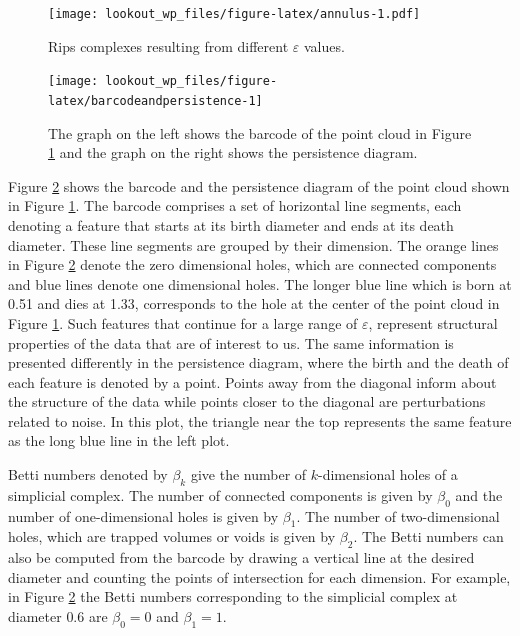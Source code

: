 \documentclass[11pt,a4paper,]{article}
\theoremstyle{definition}
\theoremstyle{definition}
\theoremstyle{definition}
\theoremstyle{remark}
\begin{document}
\begin{figure}
\centering
\texttt{[image: lookout\_wp\_files/figure-latex/annulus-1.pdf]}
\caption{\label{fig:annulus}Rips complexes resulting from different \(\varepsilon\) values.}
\end{figure}

\begin{figure}
\texttt{[image: lookout\_wp\_files/figure-latex/barcodeandpersistence-1]} \caption{The graph on the left shows the barcode of the point cloud in Figure \ref{fig:annulus} and the graph on the right shows the persistence diagram.}\label{fig:barcodeandpersistence}
\end{figure}

Figure \ref{fig:barcodeandpersistence} shows the barcode and the persistence diagram of the point cloud shown in Figure \ref{fig:annulus}. The barcode comprises a set of horizontal line segments, each denoting a feature that starts at its birth diameter and ends at its death diameter. These line segments are grouped by their dimension. The orange lines in Figure \ref{fig:barcodeandpersistence} denote the zero dimensional holes, which are connected components and blue lines denote one dimensional holes. The longer blue line which is born at 0.51 and dies at 1.33, corresponds to the hole at the center of the point cloud in Figure \ref{fig:annulus}. Such features that continue for a large range of \(\varepsilon\), represent structural properties of the data that are of interest to us. The same information is presented differently in the persistence diagram, where the birth and the death of each feature is denoted by a point. Points away from the diagonal inform about the structure of the data while points closer to the diagonal are perturbations related to noise. In this plot, the triangle near the top represents the same feature as the long blue line in the left plot.

Betti numbers denoted by \(\beta_k\) give the number of \(k\)-dimensional holes of a simplicial complex. The number of connected components is given by \(\beta_0\) and the number of one-dimensional holes is given by \(\beta_1\). The number of two-dimensional holes, which are trapped volumes or voids is given by \(\beta_2\). The Betti numbers can also be computed from the barcode by drawing a vertical line at the desired diameter and counting the points of intersection for each dimension. For example, in Figure \ref{fig:barcodeandpersistence} the Betti numbers corresponding to the simplicial complex at diameter \(0.6\) are \(\beta_0 = 0\) and \(\beta_1 = 1\).
\end{document}
